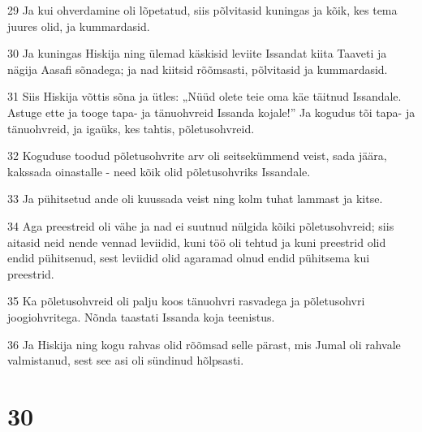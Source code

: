 \par 29 Ja kui ohverdamine oli lõpetatud, siis põlvitasid kuningas ja kõik, kes tema juures olid, ja kummardasid.
\par 30 Ja kuningas Hiskija ning ülemad käskisid leviite Issandat kiita Taaveti ja nägija Aasafi sõnadega; ja nad kiitsid rõõmsasti, põlvitasid ja kummardasid.
\par 31 Siis Hiskija võttis sõna ja ütles: „Nüüd olete teie oma käe täitnud Issandale. Astuge ette ja tooge tapa- ja tänuohvreid Issanda kojale!” Ja kogudus tõi tapa- ja tänuohvreid, ja igaüks, kes tahtis, põletusohvreid.
\par 32 Koguduse toodud põletusohvrite arv oli seitsekümmend veist, sada jäära, kakssada oinastalle - need kõik olid põletusohvriks Issandale.
\par 33 Ja pühitsetud ande oli kuussada veist ning kolm tuhat lammast ja kitse.
\par 34 Aga preestreid oli vähe ja nad ei suutnud nülgida kõiki põletusohvreid; siis aitasid neid nende vennad leviidid, kuni töö oli tehtud ja kuni preestrid olid endid pühitsenud, sest leviidid olid agaramad olnud endid pühitsema kui preestrid.
\par 35 Ka põletusohvreid oli palju koos tänuohvri rasvadega ja põletusohvri joogiohvritega. Nõnda taastati Issanda koja teenistus.
\par 36 Ja Hiskija ning kogu rahvas olid rõõmsad selle pärast, mis Jumal oli rahvale valmistanud, sest see asi oli sündinud hõlpsasti.

\chapter{30}

